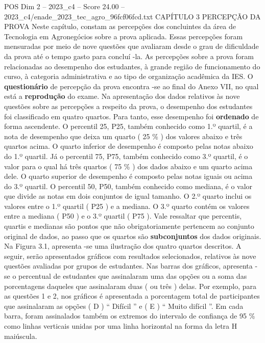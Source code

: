 \begin{textsample}{POS Dim 2 – 2023\_c4 – Score 24.00 – 2023\_c4/enade\_2023\_tec\_agro\_96fcf06fcd.txt}  \label{ex:f2_pos_014}
CAPÍTULO 3 PERCEPÇÃO DA PROVA Neste capítulo, constam as percepções dos concluintes da área de Tecnologia em Agronegócios sobre a prova aplicada.
Essas percepções foram mensuradas por meio de nove questões que avaliaram desde o grau de dificuldade da prova até o tempo gasto para concluí -la.
As percepções sobre a prova foram relacionadas ao desempenho dos estudantes, à grande região de funcionamento do curso, à categoria administrativa e ao tipo de organização acadêmica da IES.
O \textbf{questionário} de percepção da prova encontra -se ao final do Anexo VII, no qual está a \textbf{reprodução} do exame.
Na apresentação dos dados relativos às nove questões sobre as percepções a respeito da prova, o desempenho dos estudantes foi classificado em quatro quartos.
Para tanto, esse desempenho foi \textbf{ordenado} de forma ascendente.
O percentil 25, P25, também conhecido como 1.º quartil, é a nota de desempenho que deixa um quarto ( 25 \% ) dos valores abaixo e três quartos acima.
O quarto inferior de desempenho é composto pelas notas abaixo do 1.º quartil.
Já o percentil 75, P75, também conhecido como 3.º quartil, é o valor para o qual há três quartos ( 75 \% ) dos dados abaixo e um quarto acima dele.
O quarto superior de desempenho é composto pelas notas iguais ou acima do 3.º quartil.
O percentil 50, P50, também conhecido como mediana, é o valor que divide as notas em dois conjuntos de igual tamanho.
O 2.º quarto inclui os valores entre o 1.º quartil ( P25 ) e a mediana.
O 3.º quarto contém os valores entre a mediana ( P50 ) e o 3.º quartil ( P75 ).
Vale ressaltar que percentis, quartis e medianas são pontos que não obrigatoriamente pertencem ao conjunto original de dados, ao passo que os quartos são \textbf{subconjuntos} dos dados originais.
Na Figura 3.1, apresenta -se uma ilustração dos quatro quartos descritos.
A seguir, serão apresentados gráficos com resultados selecionados, relativos às nove questões avaliadas por grupos de estudantes.
Nas barras dos gráficos, apresenta -se o percentual de estudantes que assinalaram uma das opções ou a soma das porcentagens daqueles que assinalaram duas ( ou três ) delas.
Por exemplo, para as questões 1 e 2, nos gráficos é apresentada a porcentagem total de participantes que assinalaram as opções ( D ) “ Difícil ” e ( E ) “ Muito difícil ”.
Em cada barra, foram assinalados também os extremos do intervalo de confiança de 95 \% como linhas verticais unidas por uma linha horizontal na forma da letra H maiúscula.

\end{textsample}
